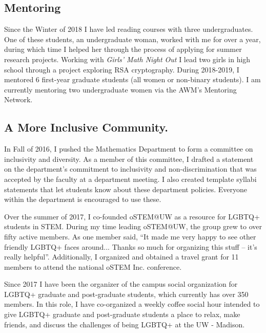 \documentclass[11pt,reqno]{amsart}
\theoremstyle{remark}
\begin{document}
\subsection{Mentoring}
Since the Winter of 2018 I have led reading courses with three undergraduates. One of these students, an undergraduate woman, worked with me for over a year, during which time I helped her through the process of applying for summer research projects. Working with \textit{Girls' Math Night Out} I lead two girls in high school through a project exploring RSA cryptography. During 2018-2019, I mentored 6 first-year graduate students (all women or non-binary students). I am currently mentoring two undergraduate women via the AWM's Mentoring Network. 


\subsection{A More Inclusive Community.} In Fall of 2016, I pushed the Mathematics Department to form a committee on inclusivity and diversity. As a member of this committee, I drafted a statement on the department's commitment to inclusivity and non-discrimination that was accepted by the faculty at a department meeting. I also created template syllabi statements that let students know about these department policies. Everyone within the department is encouraged to use these. 

Over the summer of 2017, I co-founded oSTEM@UW as a resource for LGBTQ+ students in STEM. During my time leading oSTEM@UW, the group grew to over fifty active members. As one member said, ``It made me very happy to see other friendly LGBTQ+ faces around... Thanks so much for organizing this stuff -- it's really helpful''. Additionally, I organized and obtained a travel grant for 11 members to attend the national oSTEM Inc. conference. 

Since 2017 I have been the organizer of the campus social organization for LGBTQ+ graduate and post-graduate students, which currently has over 350 members. In this role, I have co-organized a weekly coffee social hour intended to give LGBTQ+ graduate and post-graduate students a place to relax, make friends, and discuss the challenges of being LGBTQ+ at the UW - Madison.

\newpage 


\end{document}

